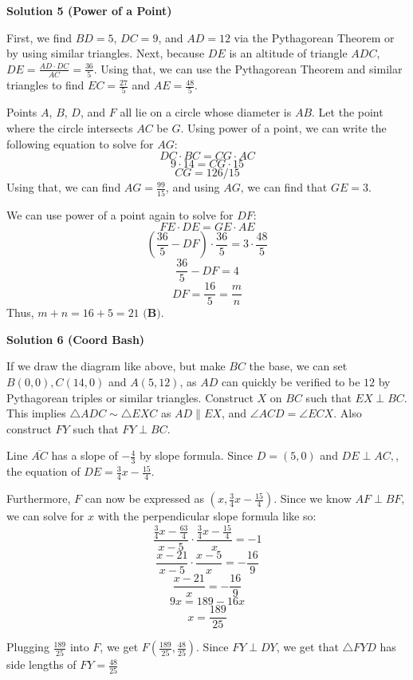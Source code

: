 \begin{enumerate}
 



\textbf{Solution 5 (Power of a Point)}

First, we find $BD = 5$, $DC = 9$, and $AD = 12$ via the Pythagorean Theorem or by using similar triangles. Next, because $DE$ is an altitude of triangle $ADC$, $DE = \frac{AD\cdot DC}{AC} = \frac{36}{5}$. Using that, we can use the Pythagorean Theorem and similar triangles to find $EC = \frac{27}{5}$ and $AE = \frac{48}{5}$. 

 Points $A$, $B$, $D$, and $F$ all lie on a circle whose diameter is $AB$. Let the point where the circle intersects $AC$ be $G$. Using power of a point, we can write the following equation to solve for $AG$: 
 \[DC\cdot BC = CG\cdot AC\] 
 \[9\cdot 14 = CG\cdot 15\] 
 \[CG = 126/15\] Using that, we can find $AG = \frac{99}{15}$, and using $AG$, we can find that $GE = 3$.

 We can use power of a point again to solve for $DF$: 
 \[FE\cdot DE = GE\cdot AE\] 
 \[(\frac{36}{5} - DF)\cdot \frac{36}{5} = 3 \cdot \frac{48}{5}\] 
 \[\frac{36}{5} - DF = 4\] 
 \[DF = \frac{16}{5} = \frac{m}{n}\] Thus, $m+n = 16+5 = 21$ $\boxed{\textbf{(B)}}$.

 



\textbf{Solution 6 (Coord Bash)}

If we draw the diagram like above, but make $BC$ the base, we can set $B(0,0), C(14,0)$ and $A(5,12)$, as $AD$ can quickly be verified to be $12$ by Pythagorean triples or similar triangles. Construct $X$ on $BC$ such that $EX \perp BC$. This implies $\triangle ADC \sim \triangle EXC$ as $AD \parallel EX$, and $\angle ACD = \angle ECX$. Also construct $FY$ such that $FY \perp BC$.

 
Line $\overline {AC}$ has a slope of $-\frac{4}{3}$ by slope formula. Since $D = (5,0)$ and $DE \perp AC,$, the equation of $DE = \frac{3}{4}x - \frac{15}{4}$. 

 Furthermore, $F$ can now be expressed as $(x,\frac{3}{4}x - \frac{15}{4}).$ Since we know $AF \perp BF,$ we can solve for $x$ with the perpendicular slope formula like so: 
 \[\frac{\frac{3}{4}x - \frac{63}{4}}{x - 5} \cdot \frac{\frac{3}{4}x - \frac {15}{4}}{x} = -1\] 
 \[\frac{x-21}{x-5} \cdot \frac{x-5}{x} = -\frac{16}{9}\] 
 \[\frac{x-21}{x} = -\frac{16}{9}\] 
 \[9x = 189 -16x\] 
 \[x = \frac{189}{25}\]

 Plugging $\frac{189}{25}$ into $F$, we get $F(\frac{189}{25},\frac{48}{25}).$ Since $FY \perp DY$, we get that $\triangle FYD$ has side lengths of $FY = \frac{48}{25}$ 


\end{enumerate}
